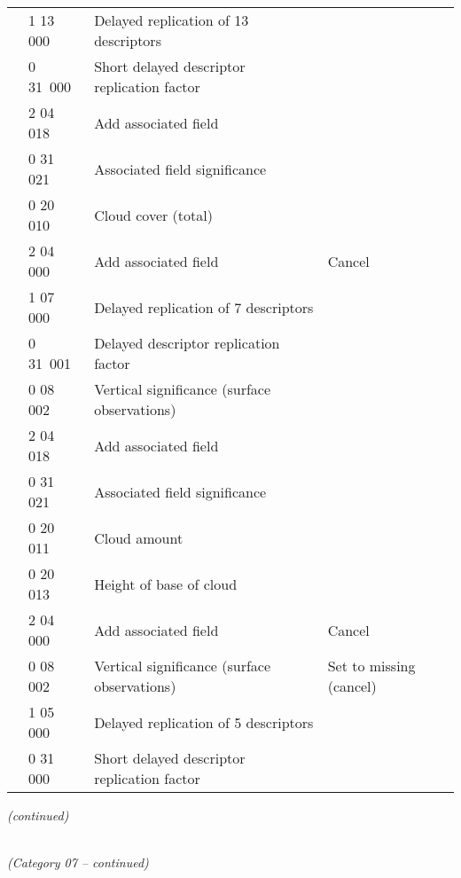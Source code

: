 \begin{longtable}[]{@{}llll@{}}
& 1 13 000 & Delayed replication of 13 descriptors &\tabularnewline
& 0 31~000 & Short delayed descriptor replication factor &\tabularnewline
& 2 04 018 & Add associated field &\tabularnewline
& 0 31 021 & Associated field significance &\tabularnewline
& 0 20 010 & Cloud cover (total) &\tabularnewline
& 2 04 000 & Add associated field & Cancel\tabularnewline
& 1 07 000 & Delayed replication of 7 descriptors &\tabularnewline
& 0 31~001 & Delayed descriptor replication factor &\tabularnewline
& 0 08 002 & Vertical significance (surface observations) &\tabularnewline
& 2 04 018 & Add associated field &\tabularnewline
& 0 31 021 & Associated field significance &\tabularnewline
& 0 20 011 & Cloud amount &\tabularnewline
& 0 20 013 & Height of base of cloud &\tabularnewline
& 2 04 000 & Add associated field & Cancel\tabularnewline
& 0 08 002 & Vertical significance (surface observations) & Set to missing (cancel)\tabularnewline
& 1 05 000 & Delayed replication of 5 descriptors &\tabularnewline
& 0 31 000 & Short delayed descriptor replication factor &\tabularnewline
\bottomrule
\end{longtable}

\emph{(continued)}

\emph{\\
(Category 07 -- continued)}

